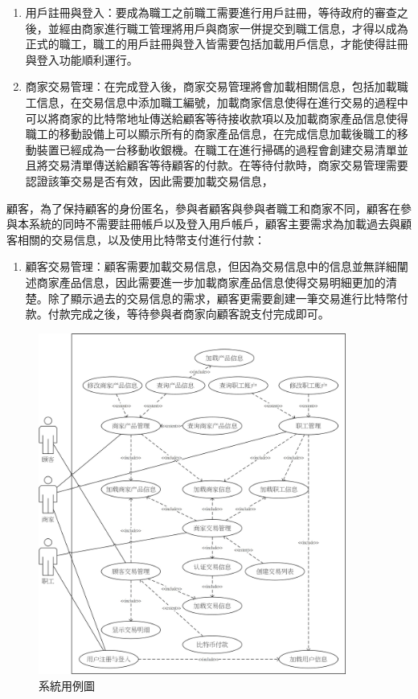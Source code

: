 	\begin{enumerate}
	\item 用戶註冊與登入：要成為職工之前職工需要進行用戶註冊，等待政府的審查之後，並經由商家進行職工管理將用戶與商家一併提交到職工信息，才得以成為正式的職工，職工的用戶註冊與登入皆需要包括加載用戶信息，才能使得註冊與登入功能順利運行。
	\item 商家交易管理：在完成登入後，商家交易管理將會加載相關信息，包括加載職工信息，在交易信息中添加職工編號，加載商家信息使得在進行交易的過程中可以將商家的比特幣地址傳送給顧客等待接收款項以及加載商家產品信息使得職工的移動設備上可以顯示所有的商家產品信息，在完成信息加載後職工的移動裝置已經成為一台移動收銀機。在職工在進行掃碼的過程會創建交易清單並且將交易清單傳送給顧客等待顧客的付款。在等待付款時，商家交易管理需要認證該筆交易是否有效，因此需要加載交易信息，
	\end{enumerate}

顧客，為了保持顧客的身份匿名，參與者顧客與參與者職工和商家不同，顧客在參與本系統的同時不需要註冊帳戶以及登入用戶帳戶，顧客主要需求為加載過去與顧客相關的交易信息，以及使用比特幣支付進行付款：
	\begin{enumerate}
	\item 顧客交易管理：顧客需要加載交易信息，但因為交易信息中的信息並無詳細闡述商家產品信息，因此需要進一步加載商家產品信息使得交易明細更加的清楚。除了顯示過去的交易信息的需求，顧客更需要創建一筆交易進行比特幣付款。付款完成之後，等待參與者商家向顧客說支付完成即可。
	\end{enumerate}

	\begin{figure}[!htbp]
	\centering
	\includegraphics[width = 0.9\textwidth]{UC.jpg}
	\caption{系統用例圖}\label{UC}
	\end{figure}

